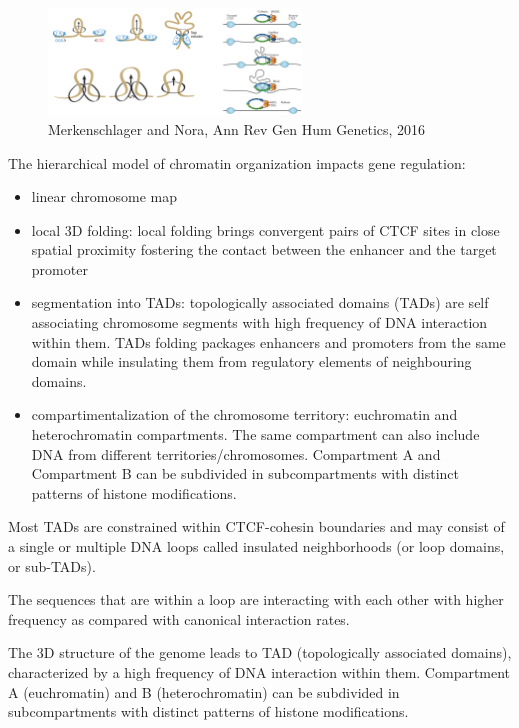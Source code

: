 \begin{figure}
\centering
\includegraphics[width=0.6\textwidth]{../_resources/Screenshot_2022-10-14_at_19-52-56.png}
\caption{Merkenschlager and Nora, Ann Rev Gen Hum Genetics, 2016}
\end{figure}

The hierarchical model of chromatin organization impacts gene regulation:

\begin{itemize}
\tightlist
\item
  linear chromosome map
\item
  local 3D folding: local folding brings convergent pairs of CTCF sites in close spatial proximity fostering the contact between the enhancer and the target promoter
\item
  segmentation into TADs: topologically associated domains (TADs) are self associating chromosome segments with high frequency of DNA interaction within them. TADs folding packages enhancers and promoters from the same domain while insulating them from regulatory elements of neighbouring domains.
\item
  compartimentalization of the chromosome territory: euchromatin and heterochromatin compartments. The same compartment can also include DNA from different territories/chromosomes. Compartment A and Compartment B can be subdivided in subcompartments with distinct patterns of histone modifications.
\end{itemize}

Most TADs are constrained within CTCF-cohesin boundaries and may consist of a single or multiple DNA loops called insulated neighborhoods (or loop domains, or sub-TADs).


The sequences that are within a loop are interacting with each other with higher frequency as compared with canonical interaction rates.

The 3D structure of the genome leads to TAD (topologically associated domains), characterized by a high frequency of DNA interaction within them. Compartment A (euchromatin) and B (heterochromatin) can be subdivided in subcompartments with distinct patterns of histone modifications.

